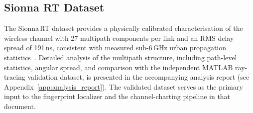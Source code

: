 \subsection{Sionna RT Dataset}
The Sionna\,RT dataset provides a physically calibrated characterisation
of the wireless channel with 27 multipath components per link and an RMS
delay spread of 191\,ns, consistent with measured sub-6\,GHz urban
propagation statistics~\cite{rappaport2013millimeter,3gpp_nr_channel}.
Detailed analysis of the multipath structure, including path-level
statistics, angular spread, and comparison with the independent MATLAB
ray-tracing validation dataset, is presented in the accompanying analysis
report (see Appendix~\ref{app:analysis_report}).
The validated dataset serves as the primary input to the fingerprint
localizer and the channel-charting pipeline in that document.